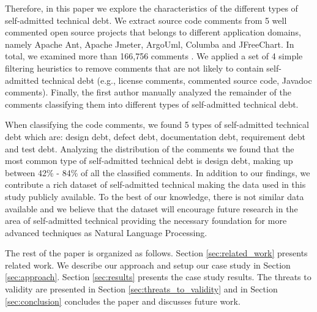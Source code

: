 
Therefore, in this paper we explore the characteristics of the different types of self-admitted technical debt. We extract source code comments from 5 well commented open source projects that belongs to different application domains, namely Apache Ant, Apache Jmeter, ArgoUml, Columba and JFreeChart. In total, we examined more than 166,756 comments . We applied a set of 4 simple filtering heuristics to remove comments that are not likely to contain self-admitted technical debt (e.g., license comments, commented source code, Javadoc comments). Finally, the first author manually analyzed the remainder of the comments classifying them into different types of self-admitted technical debt. 

When classifying the code comments, we found 5 types of self-admitted technical debt which are: design debt, defect debt, documentation debt, requirement debt and test debt. Analyzing the distribution of the comments we found that the most common type of self-admitted technical debt is design debt, making up between 42\% - 84\% of all the classified comments. In addition to our findings, we contribute a rich dataset of self-admitted technical making the data used in this study publicly available. To the best of our knowledge, there is not similar data available and we believe that the dataset will encourage future research in the area of self-admitted technical providing the necessary foundation for more advanced techniques as Natural Language Processing.  


The rest of the paper is organized as follows. Section \ref{sec:related_work} presents related work. We describe our approach and setup our case study in Section \ref{sec:approach}. Section \ref{sec:results} presents the case study results. The threats to validity are presented in Section \ref{sec:threats_to_validity} and in Section \ref{sec:conclusion} concludes the paper and discusses future work. 